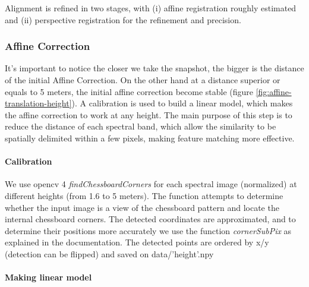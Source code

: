 \documentclass[]{elsarticle}
\begin{document}
	Alignment is refined in two stages, with
	(i) affine registration roughly estimated
	and (ii) perspective registration for the refinement and precision.
	
	\subsubsection{Affine Correction}
	
	It's important to notice the closer we take the snapshot, the bigger is the distance of the initial Affine Correction.
	On the other hand at a distance superior or equals to 5 meters, the initial affine correction become stable (figure \ref{fig:affine-translation-height}).
	A calibration is used to build a linear model, which makes the affine correction to work at any height.
	The main purpose of this step is to reduce the distance of each spectral band,
	which allow the similarity to be spatially delimited within a few pixels, making feature matching more effective.
	
	\paragraph{Calibration}
	We use opencv 4 \textit{findChessboardCorners} for each spectral image (normalized) at different heights (from 1.6 to 5 meters).
	The function attempts to determine whether the input image is a view of the chessboard pattern and locate the internal chessboard corners.
	The detected coordinates are approximated, and to determine their positions more accurately we use the function \textit{cornerSubPix} as explained in the documentation.
	The detected points are ordered by x/y (detection can be flipped) and saved on data/'height'.npy
	
	\paragraph{Making linear model}
	
\end{document}
